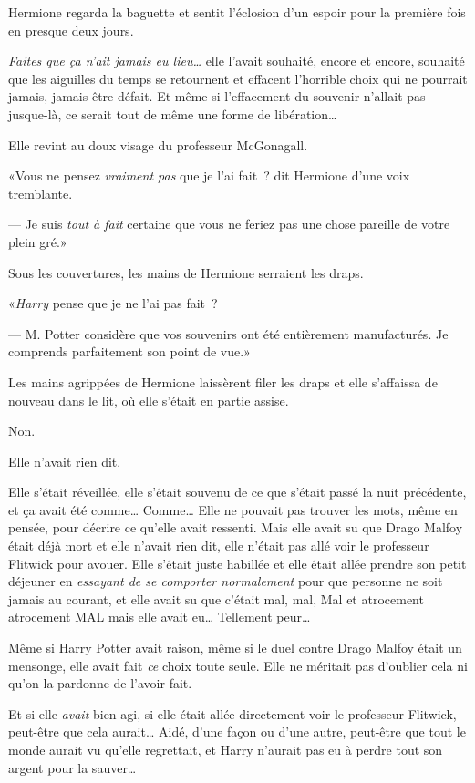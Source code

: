 Hermione regarda la baguette et sentit l'éclosion d'un espoir pour la première fois en presque deux jours.

\emph{Faites que ça n'ait jamais eu lieu…} elle l'avait souhaité, encore et encore, souhaité que les aiguilles du temps se retournent et effacent l'horrible choix qui ne pourrait jamais, jamais être défait. Et même si l'effacement du souvenir n'allait pas jusque-là, ce serait tout de même une forme de libération…

Elle revint au doux visage du professeur McGonagall.

«Vous ne pensez \emph{vraiment pas} que je l'ai fait~? dit Hermione d'une voix tremblante.

--- Je suis \emph{tout à fait} certaine que vous ne feriez pas une chose pareille de votre plein gré.»

Sous les couvertures, les mains de Hermione serraient les draps.

«\emph{Harry} pense que je ne l'ai pas fait~?

--- M. Potter considère que vos souvenirs ont été entièrement manufacturés. Je comprends parfaitement son point de vue.»

Les mains agrippées de Hermione laissèrent filer les draps et elle s'affaissa de nouveau dans le lit, où elle s'était en partie assise.

Non.

Elle n'avait rien dit.

Elle s'était réveillée, elle s'était souvenu de ce que s'était passé la nuit précédente, et ça avait été comme… Comme… Elle ne pouvait pas trouver les mots, même en pensée, pour décrire ce qu'elle avait ressenti. Mais elle avait su que Drago Malfoy était déjà mort et elle n'avait rien dit, elle n'était pas allé voir le professeur Flitwick pour avouer. Elle s'était juste habillée et elle était allée prendre son petit déjeuner en \emph{essayant de se comporter normalement} pour que personne ne soit jamais au courant, et elle avait su que c'était mal, mal, Mal et atrocement atrocement MAL mais elle avait eu… Tellement peur…

Même si Harry Potter avait raison, même si le duel contre Drago Malfoy était un mensonge, elle avait fait \emph{ce} choix toute seule. Elle ne méritait pas d'oublier cela ni qu'on la pardonne de l'avoir fait.

Et si elle \emph{avait} bien agi, si elle était allée directement voir le professeur Flitwick, peut-être que cela aurait… Aidé, d'une façon ou d'une autre, peut-être que tout le monde aurait vu qu'elle regrettait, et Harry n'aurait pas eu à perdre tout son argent pour la sauver…

